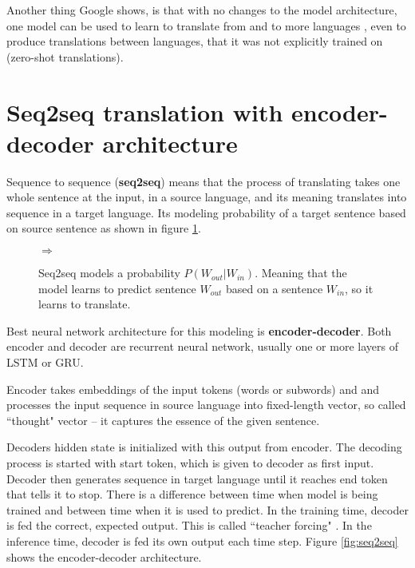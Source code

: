 \documentclass{ExcelAtFIT}
\begin{document}
Another thing Google shows, is that with no changes to the model architecture, one model can be used to learn to translate from and to more languages \cite{googleMultiLingual}, even to produce translations between languages, that it was not explicitly trained on (zero-shot translations).

\section{Seq2seq translation with encoder-decoder architecture}
Sequence to sequence (\textbf{seq2seq}) means that the process of translating takes one whole sentence at the input, in a source language, and its meaning translates into sequence in a target language. Its modeling probability of a target sentence based on source sentence as shown in figure \ref{fig:seqProbability}.

\begin{figure}[h!]
    \begin{center}
        \setlength{\fboxsep}{8pt}
        $\Longrightarrow$
    \end{center}
	\caption{Seq2seq models a probability $P(W_{out}|W_{in})$. Meaning that the model learns to predict sentence $W_{out}$ based on a sentence $W_{in}$, so it learns to translate.}
	\label{fig:seqProbability}
\end{figure}

Best neural network architecture for this modeling is \textbf{encoder-decoder}. Both encoder and decoder are recurrent neural network, usually one or more layers of LSTM or GRU.

Encoder takes embeddings of the input tokens (words or subwords) and and processes the input sequence in source language into fixed-length vector, so called ``thought" vector -- it captures the essence of the given sentence.

Decoders hidden state is initialized with this output from encoder. The decoding process is started with start token, which is given to decoder as first input. Decoder then generates sequence in target language until it reaches end token that tells it to stop. There is a difference between time when model is being trained and between time when it is used to predict. In the training time, decoder is fed the correct, expected output. This is called ``teacher forcing" \cite{teacherForcing}. In the inference time, decoder is fed its own output each time step. Figure \ref{fig:seq2seq} shows the encoder-decoder architecture.
\end{document}
